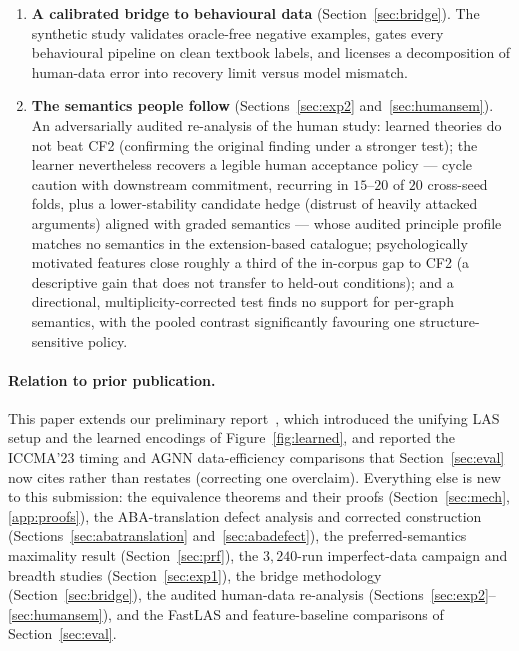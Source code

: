 \documentclass[review,12pt]{elsarticle}
\theoremstyle{definition}
\theoremstyle{remark}
\begin{document}
\begin{enumerate}[label=\textbf{C\arabic*.},leftmargin=2.5em,itemsep=2pt]
\item \textbf{A calibrated bridge to behavioural data}
(Section~\ref{sec:bridge}). The synthetic study validates oracle-free negative
examples, gates every behavioural pipeline on clean textbook labels, and
licenses a decomposition of human-data error into recovery limit versus model
mismatch.
\item \textbf{The semantics people follow} (Sections~\ref{sec:exp2}
and~\ref{sec:humansem}). An adversarially audited re-analysis of the
\citet{guillaume2022} human study: learned theories do not beat CF2 (confirming
the original finding under a stronger test); the learner nevertheless recovers a
legible human acceptance policy --- cycle caution with downstream
commitment, recurring in $15$--$20$ of $20$ cross-seed folds, plus a
lower-stability candidate hedge (distrust of heavily attacked arguments)
aligned with graded semantics --- whose audited principle profile matches no
semantics in the extension-based catalogue;
psychologically motivated features close roughly a third of the in-corpus
gap to CF2 (a descriptive gain that does not transfer to held-out
conditions); and
a directional, multiplicity-corrected test finds no support for per-graph
semantics, with the pooled contrast significantly favouring one
structure-sensitive policy.
\end{enumerate}

\paragraph{Relation to prior publication.} This paper extends our preliminary
report~\citep{mileva2023prelim}, which introduced the unifying LAS setup and
the learned encodings of Figure~\ref{fig:learned}, and reported the ICCMA'23
timing and AGNN data-efficiency comparisons that Section~\ref{sec:eval} now
cites rather than restates (correcting one overclaim). Everything else is new to this
submission: the equivalence theorems and their proofs
(Section~\ref{sec:mech}, \ref{app:proofs}), the ABA-translation defect
analysis and corrected construction (Sections~\ref{sec:abatranslation}
and~\ref{sec:abadefect}), the preferred-semantics maximality result
(Section~\ref{sec:prf}), the $3{,}240$-run imperfect-data campaign and
breadth studies (Section~\ref{sec:exp1}), the bridge methodology
(Section~\ref{sec:bridge}), the audited human-data re-analysis
(Sections~\ref{sec:exp2}--\ref{sec:humansem}), and the FastLAS and
feature-baseline comparisons of Section~\ref{sec:eval}.
\end{document}
